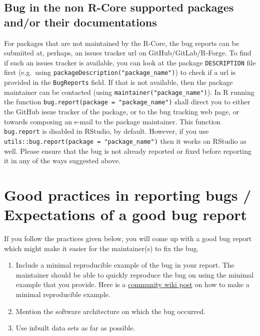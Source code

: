 \documentclass[
]{book}
\begin{document}
\hypertarget{nonRCorePkgBug}{%
\subsection{Bug in the non R-Core supported packages and/or their documentations}\label{nonRCorePkgBug}}

For packages that are not maintained by the R-Core, the bug reports can be submiited at, perhaps, an issues tracker url on GitHub/GitLab/R-Forge. To find if such an issues tracker is available, you can look at the package \texttt{DESCRIPTION} file first (e.g.~using \texttt{packageDescription("package\_name")}) to check if a url is provided in the \texttt{BugReports} field. If that is not available, then the package maintainer can be contacted (using \texttt{maintainer("package\_name")}). In R running the function \texttt{bug.report(package\ =\ "package\_name")} shall direct you to either the GitHub issue tracker of the package, or to the bug tracking web page, or towards composing an e-mail to the package maintainer. This function \texttt{bug.report} is disabled in RStudio, by default. However, if you use \texttt{utils::bug.report(package\ =\ "package\_name")} then it works on RStudio as well. Please ensure that the bug is not already reported or fixed before reporting it in any of the ways suggested above.

\hypertarget{good-practices-in-reporting-bugs-expectations-of-a-good-bug-report}{%
\section{Good practices in reporting bugs / Expectations of a good bug report}\label{good-practices-in-reporting-bugs-expectations-of-a-good-bug-report}}

If you follow the practices given below, you will come up with a good bug report which might make it easier for the maintainer(s) to fix the bug.

\begin{enumerate}
\def\labelenumi{\arabic{enumi}.}
\item
  Include a minimal reproducible example of the bug in your report. The maintainer should be able to quickly reproduce the bug on using the minimal example that you provide. Here is a \href{https://stackoverflow.com/questions/5963269/how-to-make-a-great-r-reproducible-example}{community wiki post} on how to make a minimal reproducible example.
\item
  Mention the software architecture on which the bug occurred.
\item
  Use inbuilt data sets as far as possible.
\end{enumerate}
\end{document}
